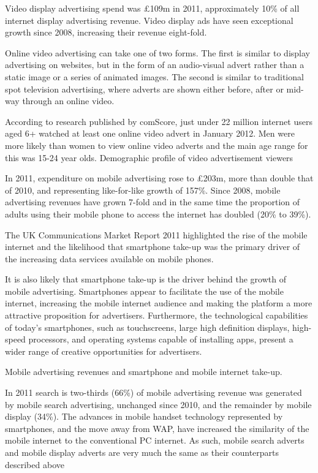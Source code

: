 \documentclass[letterpaper,10pt,openany,oneside,english]{sphinxmanual}
\begin{document}
Video display advertising spend was £109m in 2011, approximately 10\% of all internet display advertising revenue. Video display ads have seen exceptional growth since 2008, increasing their revenue eight-fold.

Online video advertising can take one of two forms. The first is similar to display advertising on websites, but in the form of an audio-visual advert rather than a static image or a series of animated images. The second is similar to traditional spot television advertising, where adverts are shown either before, after or mid-way through an online video.

According to research published by comScore, just under 22 million internet users aged 6+ watched at least one online video advert in January 2012. Men were more likely than women to view online video adverts and the main age range for this was 15-24 year olds. Demographic profile of video advertisement viewers

In 2011, expenditure on mobile advertising rose to £203m, more than double that of 2010, and representing like-for-like growth of 157\%. Since 2008, mobile advertising revenues have grown 7-fold and in the same time the proportion of adults using their mobile phone to access the internet has doubled (20\% to 39\%).

The UK Communications Market Report 2011 highlighted the rise of the mobile internet and the likelihood that smartphone take-up was the primary driver of the increasing data services available on mobile phones.

It is also likely that smartphone take-up is the driver behind the growth of mobile advertising. Smartphones appear to facilitate the use of the mobile internet, increasing the mobile internet audience and making the platform a more attractive proposition for advertisers. Furthermore, the technological capabilities of today’s smartphones, such as touchscreens, large high definition displays, high-speed processors, and operating systems capable of installing apps, present a wider range of creative opportunities for advertisers.

Mobile advertising revenues and smartphone and mobile internet take-up.

In 2011 search is two-thirds (66\%) of mobile advertising revenue was generated by mobile search advertising, unchanged since 2010, and the remainder by mobile display (34\%). The advances in mobile handset technology represented by smartphones, and the move away from WAP, have increased the similarity of the mobile internet to the conventional PC internet. As such, mobile search adverts and mobile display adverts are very much the same as their counterparts described above
\end{document}
